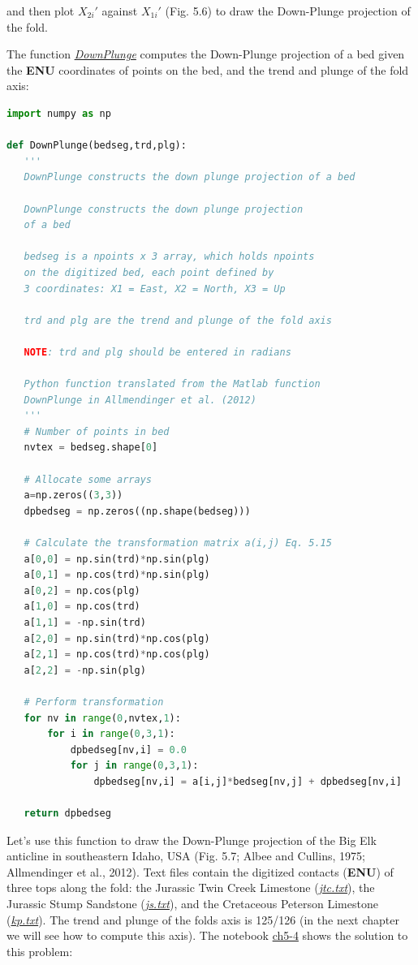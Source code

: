 \documentclass[a4paper , 12pt]{book}
\begin{document}
and then plot $X_{2i}'$ against $X_{1i}'$ (Fig. 5.6) to draw the Down-Plunge projection of the fold.

The function \href{https://github.com/nfcd/compGeo/blob/master/source/functions/DownPlunge.py}{\textit{DownPlunge}} computes the Down-Plunge projection of a bed given the \textbf{ENU} coordinates of points on the bed, and the trend and plunge of the fold axis:

\begin{lstlisting}[language=Python, frame=single]
import numpy as np

def DownPlunge(bedseg,trd,plg):
   '''
   DownPlunge constructs the down plunge projection of a bed

   DownPlunge constructs the down plunge projection
   of a bed

   bedseg is a npoints x 3 array, which holds npoints 
   on the digitized bed, each point defined by
   3 coordinates: X1 = East, X2 = North, X3 = Up

   trd and plg are the trend and plunge of the fold axis

   NOTE: trd and plg should be entered in radians

   Python function translated from the Matlab function 
   DownPlunge in Allmendinger et al. (2012)
   '''
   # Number of points in bed
   nvtex = bedseg.shape[0]

   # Allocate some arrays
   a=np.zeros((3,3))
   dpbedseg = np.zeros((np.shape(bedseg)))
   
   # Calculate the transformation matrix a(i,j) Eq. 5.15
   a[0,0] = np.sin(trd)*np.sin(plg)
   a[0,1] = np.cos(trd)*np.sin(plg)
   a[0,2] = np.cos(plg)
   a[1,0] = np.cos(trd)
   a[1,1] = -np.sin(trd)
   a[2,0] = np.sin(trd)*np.cos(plg)
   a[2,1] = np.cos(trd)*np.cos(plg)
   a[2,2] = -np.sin(plg)
    
   # Perform transformation
   for nv in range(0,nvtex,1):
       for i in range(0,3,1):
           dpbedseg[nv,i] = 0.0
           for j in range(0,3,1):
               dpbedseg[nv,i] = a[i,j]*bedseg[nv,j] + dpbedseg[nv,i]
                
   return dpbedseg
\end{lstlisting}

Let's use this function to draw the Down-Plunge projection of the Big Elk anticline in southeastern Idaho, USA (Fig. 5.7; Albee and Cullins, 1975; Allmendinger et al., 2012). Text files contain the digitized contacts (\textbf{ENU}) of three tops along the fold: the Jurassic Twin Creek Limestone (\href{https://github.com/nfcd/compGeo/blob/master/source/data/ch5-4/jtc.txt}{\textit{jtc.txt}}), the Jurassic Stump Sandstone (\href{https://github.com/nfcd/compGeo/blob/master/source/data/ch5-4/js.txt}{\textit{js.txt}}), and the Cretaceous Peterson Limestone (\href{https://github.com/nfcd/compGeo/blob/master/source/data/ch5-4/kp.txt}{\textit{kp.txt}}). The trend and plunge of the folds axis is 125/126 (in the next chapter we will see how to compute this axis). The notebook \href{https://github.com/nfcd/compGeo/blob/master/source/notebooks/ch5-4.ipynb}{ch5-4} shows the solution to this problem:
\end{document}
